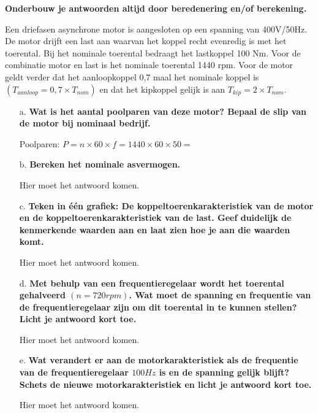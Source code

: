 \textbf{Onderbouw je antwoorden altijd door beredenering en/of berekening.}

Een driefasen asynchrone motor is aangesloten op een spanning van 400V/50Hz.
De motor drijft een last aan waarvan het koppel recht evenredig is met het toerental.
Bij het nominale toerental bedraagt het lastkoppel 100 Nm.
Voor de combinatie motor en last is het nominale toerental 1440 rpm.
Voor de motor geldt verder dat het aanloopkoppel 0,7 maal het nominale koppel is
$(T_{aanloop} = 0,7 \times T_{nom})$ en dat het kipkoppel gelijk is aan $T_{kip} = 2 \times T_{nom}$.

\begin{enumerate}
    \item [a.] \textbf{Wat is het aantal poolparen van deze motor? Bepaal de slip van de motor bij nominaal bedrijf.}
    
        Poolparen:
        $ P = n \times 60 \times f = 1440 \times 60 \times 50 =  $

    \item [b.] \textbf{Bereken het nominale asvermogen.}

        Hier moet het antwoord komen.

    \item [c.] \textbf{Teken in één grafiek: De koppeltoerenkarakteristiek van de motor en de koppeltoerenkarakteristiek van de last. Geef duidelijk de kenmerkende waarden aan en laat zien hoe je aan die waarden komt.}

        Hier moet het antwoord komen.

    \item [d.] \textbf{Met behulp van een frequentieregelaar wordt het toerental gehalveerd $(n = 720 rpm)$. Wat moet de spanning en frequentie van de frequentieregelaar zijn om dit toerental in te kunnen stellen? Licht je antwoord kort toe.} 

        Hier moet het antwoord komen.

    \item [e.] \textbf{Wat verandert er aan de motorkarakteristiek als de frequentie van de frequentieregelaar $100 Hz$ is en de spanning gelijk blijft?
    Schets de nieuwe motorkarakteristiek en licht je antwoord kort toe.}

        Hier moet het antwoord komen.

\end{enumerate}